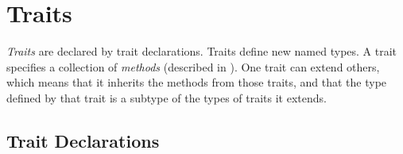 %
%
%
%

\chapter{Traits}



\emph{Traits} are declared by trait declarations.
Traits define new named types.
A trait specifies a collection of \emph{methods}
(described in ).
One trait can extend others,
which means that it inherits the methods from those traits,
and that the type defined by that trait
is a subtype of the types of traits it extends.


\section{Trait Declarations}

